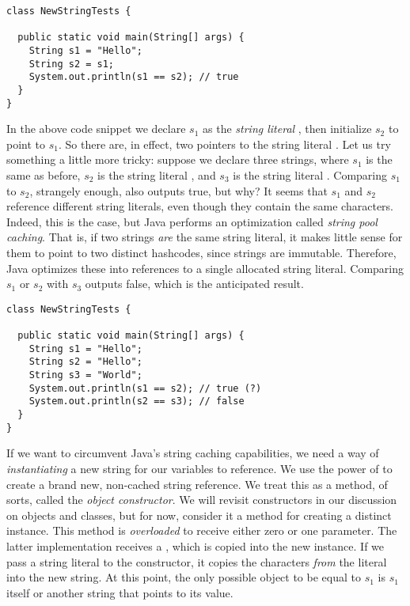 \begin{cl}[]{}
\begin{lstlisting}[language=MyJava]
class NewStringTests {

  public static void main(String[] args) {
    String s1 = "Hello";
    String s2 = s1;
    System.out.println(s1 == s2); // true
  }
}
\end{lstlisting}
\end{cl}

In the above code snippet we declare $s_1$ as the \textit{string literal} , then initialize $s_2$ to point to $s_1$. So there are, in effect, two pointers to the string literal . Let us try something a little more tricky: suppose we declare three strings, where $s_1$ is the same as before, $s_2$ is the string literal , and $s_3$ is the string literal . Comparing $s_1$ to $s_2$, strangely enough, also outputs true, but why? It seems that $s_1$ and $s_2$ reference different string literals, even though they contain the same characters. Indeed, this is the case, but Java performs an optimization called \textit{string pool caching}. That is, if two strings \textit{are} the same string literal, it makes little sense for them to point to two distinct hashcodes, since strings are immutable. Therefore, Java optimizes these into references to a single allocated string literal. Comparing $s_1$ or $s_2$ with $s_3$ outputs false, which is the anticipated result.

\begin{cl}[]{}
\begin{lstlisting}[language=MyJava]
class NewStringTests {

  public static void main(String[] args) {
    String s1 = "Hello";
    String s2 = "Hello";
    String s3 = "World";
    System.out.println(s1 == s2); // true (?)
    System.out.println(s2 == s3); // false
  }
}
\end{lstlisting}
\end{cl}

If we want to circumvent Java's string caching capabilities, we need a way of \textit{instantiating} a new string for our variables to reference. We use the power of  to create a brand new, non-cached string reference. We treat this as a method, of sorts, called the \textit{object constructor}. We will revisit constructors in our discussion on objects and classes, but for now, consider it a method for creating a distinct  instance. This method is \textit{overloaded} to receive either zero or one parameter. The latter implementation receives a , which is copied into the new  instance. If we pass a string literal to the constructor, it copies the characters \textit{from} the literal into the new string. At this point, the only possible object to be equal to $s_1$ is $s_1$ itself or another string that points to its value.


